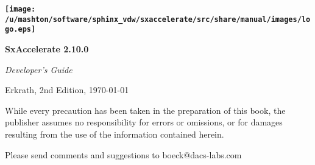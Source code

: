 \thispagestyle{empty}\vspace*{.2\textheight}


\begin{flushright}
\textbf{\Huge \texttt{[image: /u/mashton/software/sphinx\_vdw/sxaccelerate/src/share/manual/images/logo.eps]}}
\par\end{flushright}{\Huge \par}

\begin{flushright}
\textbf{\Huge SxAccelerate 2.10.0}
\par\end{flushright}{\Huge \par}

\begin{flushright}
{\Huge \hrulefill}
\par\end{flushright}{\Huge \par}

\begin{flushright}
\emph{\Huge Developer's Guide}
\par\end{flushright}{\Huge \par}

\newpage{}

\textbf{\Huge \thispagestyle{empty}}{\Huge \par}

{\small Erkrath, 2nd Edition, \today}{\small \par}

\vspace*{11cm}
While every precaution has been taken in the preparation of this book,
the publisher assumes no responsibility for errors or omissions, or
for damages resulting from the use of the information contained herein.
\vspace{1em}

Please send comments and suggestions to boeck@dacs-labs.com\newpage{}
